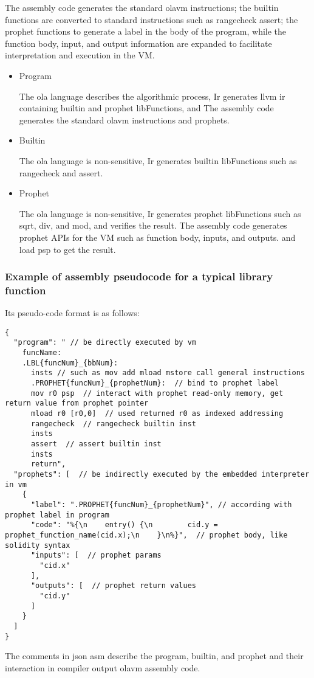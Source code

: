     The assembly code generates the standard olavm instructions; the builtin functions are converted to standard instructions such as rangecheck assert;
the prophet functions to generate a label in the body of the program, while the function body, input, and output information are expanded to facilitate interpretation and execution in the VM.
\begin{itemize}
    \item Program

    The ola language describes the algorithmic process, Ir generates llvm ir containing builtin and prophet libFunctions, and The assembly code generates the standard olavm instructions and prophets.
    \item Builtin

    The ola language is non-sensitive, Ir generates builtin libFunctions such as rangecheck and assert.
    \item Prophet

    The ola language is non-sensitive, Ir generates prophet libFunctions such as sqrt, div, and mod, and verifies the result.
The assembly code generates prophet APIs for the VM such as function body, inputs, and outputs. and load psp to get the result.
\end{itemize}

\subsubsection*{Example of assembly pseudocode for a typical library function}

Its pseudo-code format is as follows:
\begin{lstlisting}[language={}]
{
  "program": " // be directly executed by vm
    funcName:
    .LBL{funcNum}_{bbNum}:
      insts // such as mov add mload mstore call general instructions
      .PROPHET{funcNum}_{prophetNum}:  // bind to prophet label
      mov r0 psp  // interact with prophet read-only memory, get return value from prophet pointer
      mload r0 [r0,0]  // used returned r0 as indexed addressing
      rangecheck  // rangecheck builtin inst
      insts
      assert  // assert builtin inst
      insts
      return",
  "prophets": [  // be indirectly executed by the embedded interpreter in vm
    {
      "label": ".PROPHET{funcNum}_{prophetNum}", // according with prophet label in program
      "code": "%{\n    entry() {\n        cid.y = prophet_function_name(cid.x);\n    }\n%}",  // prophet body, like solidity syntax
      "inputs": [  // prophet params
        "cid.x"
      ],
      "outputs": [  // prophet return values
        "cid.y"
      ]
    }
  ]
}
\end{lstlisting}
The comments in json asm describe the program, builtin, and prophet and their interaction in compiler output olavm assembly code.

